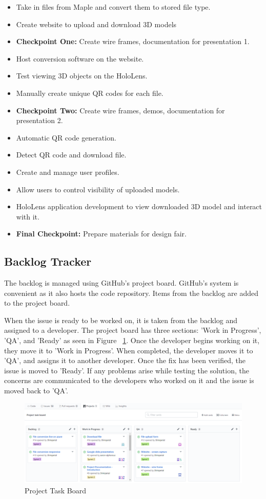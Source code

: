 \begin{itemize}
\item Take in files from Maple and convert them to stored file type.
\item Create website to upload and download 3D models
\item \textbf{Checkpoint One:} Create wire frames, documentation for presentation 1.
\item Host conversion software on the website.
\item Test viewing 3D objects on the HoloLens.
\item Manually create unique QR codes for each file. 
\item \textbf{Checkpoint Two:} Create wire frames, demos, documentation for presentation 2.
\item Automatic QR code generation.
\item Detect QR code and download file.
\item Create and manage user profiles.
\item Allow users to control visibility of uploaded models.
\item HoloLens application development to view downloaded 3D model and interact 
with it.
\item \textbf{Final Checkpoint:} Prepare materials for design fair.
\end{itemize}

\subsection{Backlog Tracker}

The backlog is managed using GitHub's project board. GitHub's system is 
convenient as it also hosts the code repository. Items from the backlog 
are added to the project board.

When the issue is ready to be worked on, it is taken from the backlog and 
assigned to a developer. The project board has three sections: 
'Work in Progress', 'QA', and 'Ready' as seen in Figure 
~\ref{fig:ProjectTaskBoard}. Once the developer begins working on it, 
they move it to 'Work in Progress'. When completed, the developer
moves it to 'QA', and assigns it to another developer. Once the fix has been verified, the issue is moved to 'Ready'. If any problems arise while testing the solution, the concerns are communicated to the developers who worked on it and the issue is moved back to 'QA'.

\begin{figure}[H]
    \centering
    \includegraphics[width=\textwidth]{ProjectTaskBoard.png}
    \caption{Project Task Board}
    \label{fig:ProjectTaskBoard}
\end{figure}

